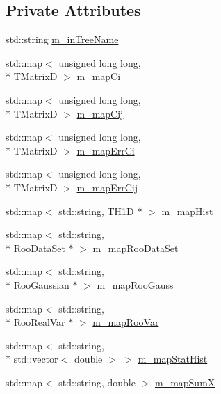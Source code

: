 \subsection*{Private Attributes}
\begin{DoxyCompactItemize}
\item 
std\+::string \hyperlink{classBiasAnalysis_ab68b9ae883b88b32d4c19a3899547b6c}{m\+\_\+in\+Tree\+Name}
\item 
std\+::map$<$ unsigned long long, \\*
T\+Matrix\+D $>$ \hyperlink{classBiasAnalysis_a4001a86dfd3b86e570c84d06d5ffbcda}{m\+\_\+map\+Ci}
\item 
std\+::map$<$ unsigned long long, \\*
T\+Matrix\+D $>$ \hyperlink{classBiasAnalysis_ae41add82d66b3f3b94fa938f7d3173c7}{m\+\_\+map\+Cij}
\item 
std\+::map$<$ unsigned long long, \\*
T\+Matrix\+D $>$ \hyperlink{classBiasAnalysis_a3dbd3ee5b793f0498b17eff9d6edd20f}{m\+\_\+map\+Err\+Ci}
\item 
std\+::map$<$ unsigned long long, \\*
T\+Matrix\+D $>$ \hyperlink{classBiasAnalysis_abc3cdf3373df2ca1b633bf07d3fc0ed5}{m\+\_\+map\+Err\+Cij}
\item 
std\+::map$<$ std\+::string, T\+H1\+D $\ast$ $>$ \hyperlink{classBiasAnalysis_aa498719992c21c66b1a94805a729ff28}{m\+\_\+map\+Hist}
\item 
std\+::map$<$ std\+::string, \\*
Roo\+Data\+Set $\ast$ $>$ \hyperlink{classBiasAnalysis_af76275d00d02cf4d86ed118b93137a95}{m\+\_\+map\+Roo\+Data\+Set}
\item 
std\+::map$<$ std\+::string, \\*
Roo\+Gaussian $\ast$ $>$ \hyperlink{classBiasAnalysis_a0d48d7f2ff9f80845a9497424df41333}{m\+\_\+map\+Roo\+Gauss}
\item 
std\+::map$<$ std\+::string, \\*
Roo\+Real\+Var $\ast$ $>$ \hyperlink{classBiasAnalysis_a97398da96a4afaf1b4b69a8bd834f555}{m\+\_\+map\+Roo\+Var}
\item 
std\+::map$<$ std\+::string, \\*
std\+::vector$<$ double $>$ $>$ \hyperlink{classBiasAnalysis_a4012de0928fa751a15e9a6fecd2249ec}{m\+\_\+map\+Stat\+Hist}
\item 
std\+::map$<$ std\+::string, double $>$ \hyperlink{classBiasAnalysis_a01057845bb932055dd6a9607175b29a6}{m\+\_\+map\+Sum\+X}

\end{DoxyCompactItemize}
